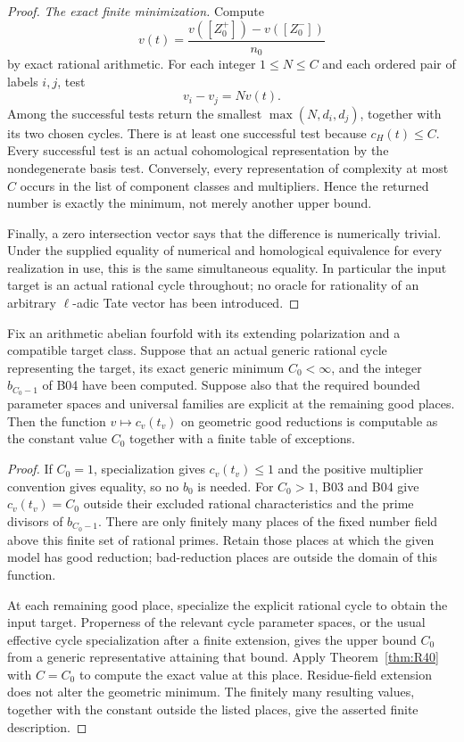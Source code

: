 \begin{proof}
\emph{The exact finite minimization.}
Compute
\[
 v(t)=\frac{v([Z_0^+])-v([Z_0^-])}{n_0}
\]
by exact rational arithmetic. For each integer $1\leq N\leq C$ and
each ordered pair of labels $i,j$, test
\[
                         v_i-v_j=Nv(t).
\]
Among the successful tests return the smallest
$\max(N,d_i,d_j)$, together with its two chosen cycles. There is at
least one successful test because $c_H(t)\leq C$. Every successful
test is an actual cohomological representation by the nondegenerate
basis test. Conversely, every representation of complexity at most
$C$ occurs in the list of component classes and multipliers. Hence
the returned number is exactly the minimum, not merely another upper
bound.

Finally, a zero intersection vector says that the difference is
numerically trivial. Under the supplied equality of numerical and
homological equivalence for every realization in use, this is the same
simultaneous equality. In particular the input target is an actual
rational cycle throughout; no oracle for rationality of an arbitrary
$\ell$-adic Tate vector has been introduced.
\end{proof}

\begin{corollary}
\label{cor:R41}
Fix an arithmetic abelian fourfold with its extending polarization and
a compatible target class. Suppose that an actual generic rational
cycle representing the target, its exact generic minimum $C_0<\infty$,
and the integer $b_{C_0-1}$ of B04 have been computed. Suppose also that
the required bounded parameter spaces and universal families are
explicit at the remaining good places. Then the function
$v\mapsto c_v(t_v)$ on geometric good reductions is computable as the
constant value $C_0$ together with a finite table of exceptions.
\end{corollary}
\begin{proof}
If $C_0=1$, specialization gives $c_v(t_v)\leq1$ and the positive
multiplier convention gives equality, so no $b_0$ is needed.
For $C_0>1$, B03 and B04 give $c_v(t_v)=C_0$ outside their excluded
rational characteristics and the prime divisors of $b_{C_0-1}$.
There are only finitely many places of the fixed number field above
this finite set of rational primes. Retain those places at which the
given model has good reduction; bad-reduction places are outside the
domain of this function.

At each remaining good place, specialize the explicit rational cycle
to obtain the input target. Properness of the relevant cycle parameter
spaces, or the usual effective cycle specialization after a finite
extension, gives the upper bound $C_0$ from a generic representative
attaining that bound. Apply Theorem~\ref{thm:R40} with $C=C_0$ to
compute the exact value at this place. Residue-field extension does not
alter the geometric minimum. The finitely many resulting values,
together with the constant outside the listed places, give the asserted
finite description.
\end{proof}


